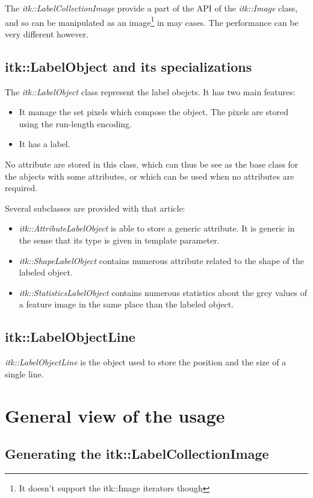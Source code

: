 \documentclass{InsightArticle}
\begin{document}
The {\em itk::LabelCollectionImage} provide a part of the API of the {\em
itk::Image} class,
and so can be manipulated as an image\footnote{It doesn't support the itk::Image
iterators though}
in may cases. The performance can be very different however.

\subsection{itk::LabelObject and its specializations}

The {\em itk::LabelObject} class represent the label obejcts. It has two main
features:
\begin{itemize}
  \item It manage the set pixels which compose the object. The pixels are stored
using the run-length encoding.
  \item It has a label.
\end{itemize}

No attribute are stored in this class, which can thus be see as the base class
for the abjects with some attributes, or which can be used when no attributes
are required.

Several subclasses are provided with that article:
\begin{itemize}
  \item {\em itk::AttributeLabelObject} is able to store a generic attribute. It
is generic in the sense that its type is given in template parameter.
  \item {\em itk::ShapeLabelObject} contains numerous attribute related to the
shape of the labeled object.
  \item {\em itk::StatisticsLabelObject} contains numerous statistics about the
grey values of a feature image in the same place than the labeled object.
\end{itemize}


\subsection{itk::LabelObjectLine}

{\em itk::LabelObjectLine} is the object used to store the position and the size
of a single line.

\section{General view of the usage}

\subsection{Generating the itk::LabelCollectionImage}
\end{document}
